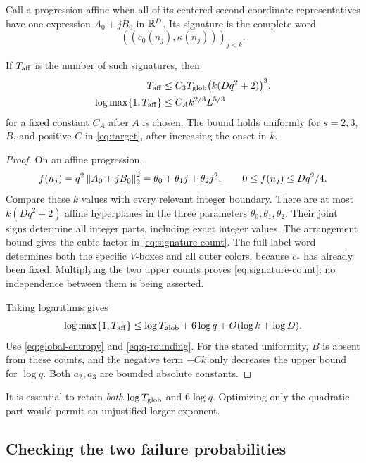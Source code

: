 Call a progression affine when all of its centered second-coordinate
representatives have one expression \(A_0+jB_0\) in \(\mathbb R^D\).
Its signature is the complete word
\[
 ((c_0(n_j),\kappa(n_j)))_{j<k}.
\]

\begin{lemma}\label{lem:signature}
If \(T_{\rm aff}\) is the number of such signatures, then
\begin{align}
 T_{\rm aff}&\le
 C_3T_{\rm glob}\bigl(k(Dq^2+2)\bigr)^3,
 \label{eq:signature-count}\\
 \log\max\{1,T_{\rm aff}\}
 &\le C_A k^{2/3}L^{5/3}
 \label{eq:signature-entropy}
\end{align}
for a fixed constant \(C_A\) after \(A\) is chosen.
The bound holds uniformly for \(s=2,3\), \(B\), and positive \(C\)
in \eqref{eq:target}, after increasing the onset in \(k\).
\end{lemma}

\begin{proof}
On an affine progression,
\[
 f(n_j)=q^2\left\lVert A_0+jB_0\right\rVert_2^2
       =\theta_0+\theta_1j+\theta_2j^2,\qquad
 0\le f(n_j)\le Dq^2/4.
\]
Compare these \(k\) values with every relevant integer boundary.
There are at most \(k(Dq^2+2)\) affine hyperplanes in the three
parameters \(\theta_0,\theta_1,\theta_2\).
Their joint signs determine all integer parts, including exact
integer values. The arrangement bound gives the cubic factor in
\eqref{eq:signature-count}.
The full-label word determines both the specific \(V\)-boxes and all
outer colors, because \(c_*\) has already been fixed.
Multiplying the two upper counts proves \eqref{eq:signature-count};
no independence between them is being asserted.

Taking logarithms gives
\[
 \log\max\{1,T_{\rm aff}\}
 \le \log T_{\rm glob}+6\log q+O(\log k+\log D).
\]
Use \eqref{eq:global-entropy} and \eqref{eq:q-rounding}.
For the stated uniformity, \(B\) is absent from these counts, and the
negative term \(-Ck\) only decreases the upper bound for \(\log q\).
Both \(a_2,a_3\) are bounded absolute constants.
\end{proof}

It is essential to retain \emph{both} \(\log T_{\rm glob}\) and
\(6\log q\). Optimizing only the quadratic part would permit an
unjustified larger exponent.

\subsection{Checking the two failure probabilities}

